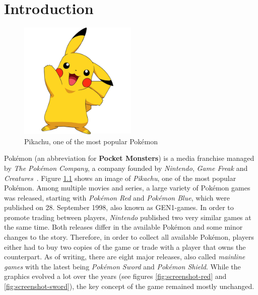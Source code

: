 
\chapter{Introduction}
\label{ch:introduction}

\begin{figure}
    \begin{center}
      \includegraphics[width=0.5\textwidth]{images/pikachu.png}
    \end{center}
    \caption{Pikachu, one of the most popular Pokémon~\autocite{Fandom:AshsPikachu}}
    \label{fig:pikachu-image}
\end{figure}
Pokémon (an abbreviation for \textbf{Pocket Monsters}) is a media franchise managed by \textit{The Pokémon Company}, a company
founded by \textit{Nintendo}, \textit{Game Freak} and \textit{Creatures}~\autocite{Wikipedia:Pokemon}. Figure \ref{fig:pikachu-image} shows an image of
\textit{Pikachu}, one of the most popular Pokémon. Among multiple movies and series, a large variety of Pokémon games was released, starting with
\textit{Pokémon Red} and \textit{Pokémon Blue}, which were published on 28. September 1998, also known as \ac{GEN1}-games. In order to promote
trading between players, \textit{Nintendo} published two very similar games at the same time. 
Both releases differ in the available Pokémon and some minor changes to the story. Therefore, in order to collect all available Pokémon,
players either had to buy two copies of the game or trade with a player that owns the counterpart. As of writing, there are eight major
releases, also called \textit{mainline games} with the latest being \textit{Pokémon Sword} and \textit{Pokémon Shield}. While the graphics
evolved a lot over the years (see figures \ref{fig:screenshot-red} and \ref{fig:screenshot-sword}), the key concept of the 
game remained mostly unchanged. 
